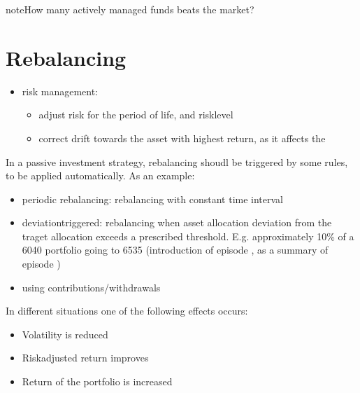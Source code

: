 \documentclass[letterpaper,10pt,english]{jupyterBook}
\begin{document}
\begin{sphinxadmonition}{note}{How many actively managed funds beats the market?}

\sphinxAtStartPar
{}
\end{sphinxadmonition}

\sphinxstepscope


\chapter{Rebalancing}
\label{\detokenize{ch/investing/rebalancing:rebalancing}}\label{\detokenize{ch/investing/rebalancing:fin-edu-investing-rebalancing}}\label{\detokenize{ch/investing/rebalancing::doc}}
\sphinxAtStartPar
{}
\begin{itemize}
\item {} 
\sphinxAtStartPar
risk management:
\begin{itemize}
\item {} 
\sphinxAtStartPar
adjust risk for the period of life, and risk\sphinxhyphen{}level

\item {} 
\sphinxAtStartPar
correct drift towards the asset with highest return, as it affects the

\end{itemize}

\end{itemize}

\sphinxAtStartPar
{}
In a passive investment strategy, rebalancing shoudl be triggered by some rules, to be applied automatically. As an example:
\begin{itemize}
\item {} 
\sphinxAtStartPar
periodic rebalancing: rebalancing with constant time interval

\item {} 
\sphinxAtStartPar
deviation\sphinxhyphen{}triggered: rebalancing when asset allocation deviation from the traget allocation exceeds a prescribed threshold. E.g. approximately 10\% of a 60\sphinxhyphen{}40 portfolio going to 65\sphinxhyphen{}35 (introduction of episode , as a summary of episode )

\item {} 
\sphinxAtStartPar
using contributions/withdrawals

\end{itemize}

\sphinxAtStartPar
{} In different situations one of the following effects occurs:
\begin{itemize}
\item {} 
\sphinxAtStartPar
Volatility is reduced

\item {} 
\sphinxAtStartPar
Risk\sphinxhyphen{}adjusted return improves

\item {} 
\sphinxAtStartPar
Return of the portfolio is increased

\end{itemize}
\end{document}
